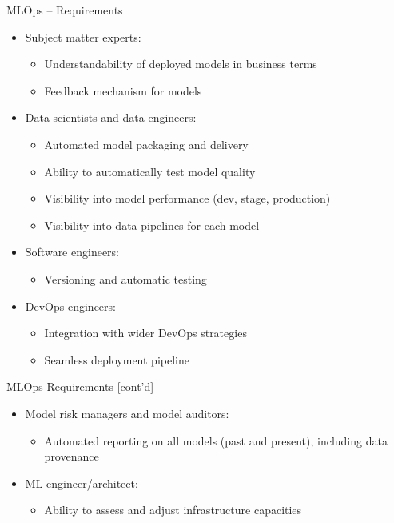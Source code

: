 \documentclass[ignorenonframetext,xcolor=x11names]{beamer}
\begin{document}
\begin{frame}[label=full]{MLOps -- Requirements}
\begin{itemize}
   \item Subject matter experts:
   \begin{itemize}
  \footnotesize
   \item Understandability of deployed models in business terms
   \item Feedback mechanism for models
   \end{itemize}
   \item Data scientists and data engineers:
   \begin{itemize}
  \footnotesize
   \item Automated model packaging and delivery
   \item Ability to automatically test model quality
   \item Visibility into model performance (dev, stage, production)
   \item Visibility into data pipelines for each model
   \end{itemize}
   \item Software engineers:
   \begin{itemize}
  \footnotesize
   \item Versioning and automatic testing
   \end{itemize}
   \item DevOps engineers:
   \begin{itemize}
  \footnotesize
   \item Integration with wider DevOps strategies
   \item Seamless deployment pipeline
   \end{itemize}
\end{itemize}
\end{frame}

\begin{frame}[label=full]{MLOps Requirements \small [cont'd]}
\begin{itemize}
   \item Model risk managers and model auditors:
   \begin{itemize}
  \footnotesize
   \item Automated reporting on all models (past and present), including data provenance
   \end{itemize}
   \item ML engineer/architect:
   \begin{itemize}
  \footnotesize
   \item Ability to assess and adjust infrastructure capacities
   \end{itemize}
\end{itemize}
\end{frame}
\end{document}
